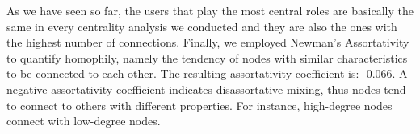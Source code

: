 \documentclass[sigchi]{acmart}
\begin{document}
\begin{table}[!htbp]
\centering
\caption{Other Centrality Measures}
\end{table}

As we have seen so far, the users that play the most central roles are basically the same in every centrality analysis we conducted and they are also the ones with the highest number of connections.
Finally, we employed Newman’s Assortativity to quantify homophily, namely the tendency of nodes with similar characteristics to be connected to each other. The resulting assortativity coefficient is: -0.066. 
A negative assortativity coefficient indicates disassortative mixing, thus nodes tend to connect to others with different properties. For instance, high-degree nodes connect with low-degree nodes.
\end{document}
